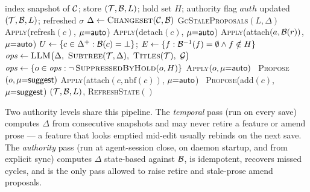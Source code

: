 \begin{algorithm}[t]
\caption{Loop A --- code $\to$ tree reflection (one pass)}
\label{alg:loop-a}
\begin{algorithmic}[1]
\Require index snapshot of $\mathcal{C}$; store $(\mathcal{T}, \mathcal{B}, L)$; hold set $H$; authority flag $\mathit{auth}$
\Ensure updated $(\mathcal{T}, \mathcal{B}, L)$; refreshed $\sigma$
\State $\Delta \gets \textsc{Changeset}(\mathcal{C}, \mathcal{B})$ 
\State \textsc{GcStaleProposals}$(L, \Delta)$ 
 \textsc{Apply}(\textsf{refresh}$(c)$, $\mu{=}\textsf{auto}$) \EndFor \label{line:auto-start}
 \textsc{Apply}(\textsf{detach}$(c)$, $\mu{=}\textsf{auto}$) \EndFor
{} 
    \State \textsc{Apply}(\textsf{attach}$(a, \mathcal{B}(r))$, $\mu{=}\textsf{auto}$) \label{line:reloc-end}
\EndFor
\State $U \gets \{c \in \Delta^{+} : \mathcal{B}(c) = \bot\}$;\quad
       $E \gets \{f : \mathcal{B}^{-1}(f) = \emptyset \wedge f \notin H\}$ 
    \State $\mathit{ops} \gets \textsc{LLM}\bigl(\Delta,\ \textsc{Subtree}(\T, \Delta),\ \textsc{Titles}(\T),\ \G\bigr)$  \label{line:llm}
    \State $\mathit{ops} \gets \{o \in \mathit{ops} : \neg\,\textsc{SuppressedByHold}(o, H)\}$ \label{line:hold}
         \textsc{Apply}$(o, \mu{=}\textsf{auto})$
        \Else\ \textsc{Propose}$(o, \mu{=}\textsf{suggest})$ 
        \EndIf
    \EndFor
\EndIf
{} \label{line:covnet-start} 
     \textsc{Apply}(\textsf{attach}$(c, \mathrm{nbf}(c))$, $\mu{=}\textsf{auto}$)
    \Else\ \textsc{Propose}(\textsf{add}$(c)$, $\mu{=}\textsf{suggest}$)
    \EndIf
\EndFor \label{line:covnet-end}
\State \Return $(\mathcal{T}, \mathcal{B}, L)$, \textsc{RefreshState}$()$
\end{algorithmic}
\end{algorithm}

Two authority levels share this pipeline. The \emph{temporal} pass (run on
every save) computes $\Delta$ from consecutive snapshots and may never retire a
feature or amend prose --- a feature that looks emptied mid-edit usually
rebinds on the next save. The \emph{authority} pass (run at agent-session
close, on daemon startup, and from explicit sync) computes $\Delta$ state-based
against $\mathcal{B}$, is idempotent, recovers missed cycles, and is the only pass
allowed to raise \textsf{retire} and stale-prose \textsf{amend} proposals.

